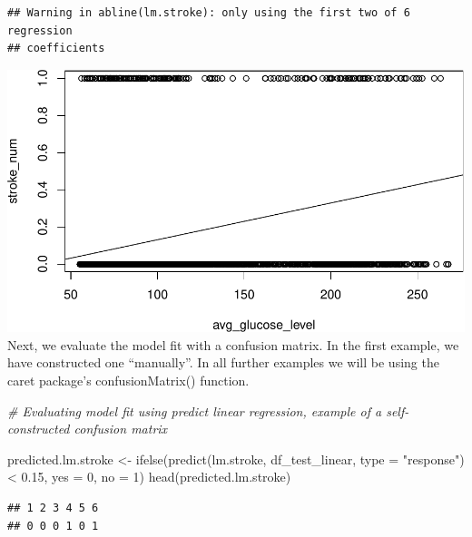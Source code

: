 \documentclass[
]{article}
\newenvironment{Shaded}{\begin{snugshade}}{\end{snugshade}}
\newcommand{\AttributeTok}[1]{\textcolor[rgb]{0.77,0.63,0.00}{#1}}
\newcommand{\CommentTok}[1]{\textcolor[rgb]{0.56,0.35,0.01}{\textit{#1}}}
\newcommand{\DecValTok}[1]{\textcolor[rgb]{0.00,0.00,0.81}{#1}}
\newcommand{\FloatTok}[1]{\textcolor[rgb]{0.00,0.00,0.81}{#1}}
\newcommand{\FunctionTok}[1]{\textcolor[rgb]{0.00,0.00,0.00}{#1}}
\newcommand{\NormalTok}[1]{#1}
\newcommand{\OtherTok}[1]{\textcolor[rgb]{0.56,0.35,0.01}{#1}}
\newcommand{\SpecialCharTok}[1]{\textcolor[rgb]{0.00,0.00,0.00}{#1}}
\newcommand{\StringTok}[1]{\textcolor[rgb]{0.31,0.60,0.02}{#1}}
\renewcommand{\=}[1]{\stackrel{#1}{=}}
\theoremstyle{definition}
\theoremstyle{remark}
\begin{document}
\begin{verbatim}
## Warning in abline(lm.stroke): only using the first two of 6 regression
## coefficients
\end{verbatim}

\includegraphics{sioux_mach_learn_project_files/figure-latex/unnamed-chunk-30-4.pdf}
Next, we evaluate the model fit with a confusion matrix. In the first example, we have constructed one ``manually''.
In all further examples we will be using the caret package's confusionMatrix() function.

\begin{Shaded}
\begin{Highlighting}[]
\CommentTok{\# Evaluating model fit using predict linear regression, example of a self{-}constructed confusion matrix}

\NormalTok{predicted.lm.stroke }\OtherTok{\textless{}{-}} \FunctionTok{ifelse}\NormalTok{(}\FunctionTok{predict}\NormalTok{(lm.stroke, df\_test\_linear, }\AttributeTok{type =} \StringTok{"response"}\NormalTok{) }\SpecialCharTok{\textless{}} \FloatTok{0.15}\NormalTok{, }\AttributeTok{yes =} \DecValTok{0}\NormalTok{, }\AttributeTok{no =} \DecValTok{1}\NormalTok{)}
\FunctionTok{head}\NormalTok{(predicted.lm.stroke)}
\end{Highlighting}
\end{Shaded}

\begin{verbatim}
## 1 2 3 4 5 6 
## 0 0 0 1 0 1
\end{verbatim}

\begin{Shaded}
\end{Shaded}
\end{document}
